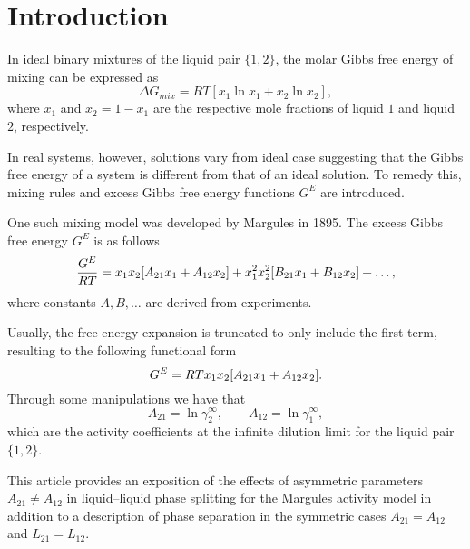 \section{Introduction}


In ideal binary mixtures of the liquid pair $\{1,2\}$, the molar Gibbs free energy of 
mixing can be expressed as
\[
    \Delta G_{mix} = RT[x_1\ln x_1 + x_2\ln x_2],
\]
where $x_1$ and $x_2 = 1 - x_1$ are the respective mole fractions of liquid 
$1$ and liquid $2$, respectively.

In real systems, however, solutions vary from ideal case suggesting that the
Gibbs free energy of a system is different from that of an ideal solution.
To remedy this, mixing rules and excess Gibbs free energy functions $G^E$ 
are introduced.

One such mixing model was developed by Margules in 1895. %
The excess Gibbs free energy $G^E$ is as follows
\begin{equation}
    \dfrac{G^E}{RT} = x_1x_2 \qty[A_{21}x_1 + A_{12}x_2] + x_1^2x_2^2
    \qty[B_{21}x_1 + B_{12}x_2] + \ldots,
\end{equation}
where constants $A, B, \ldots$ are derived from experiments. %

Usually, the free energy expansion is truncated to only include the first term,
resulting to the following functional form
\begin{equation}
    G^E = RTx_1x_2 \qty[A_{21} x_1 + A_{12}x_2].
\end{equation}
Through some manipulations we have that
\begin{equation}\label{eq:inf-dil}
    A_{21} = \ln \gamma_2^\infty,\qquad
    A_{12} = \ln \gamma_1^\infty,
\end{equation}
which are the activity coefficients at the infinite dilution limit for the
liquid pair $\{1,2\}$.

This article provides an exposition of the effects of asymmetric parameters
$A_{21} \neq A_{12}$ in liquid--liquid phase splitting for the Margules 
activity model in addition to a description of phase separation in the 
symmetric cases $A_{21} = A_{12}$ and $L_{21} = L_{12}$.
